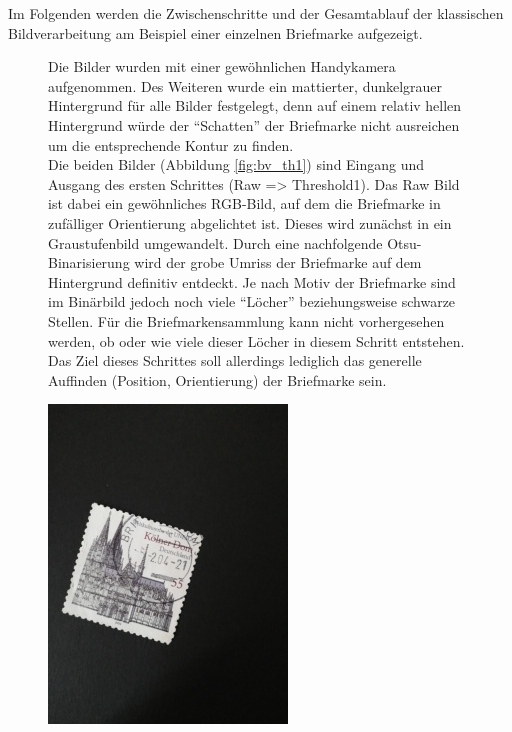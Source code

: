 \documentclass[12pt,toc=bib,toc=listof]{scrreprt}
\begin{document}
Im Folgenden werden die Zwischenschritte und der Gesamtablauf der klassischen Bildverarbeitung am Beispiel einer einzelnen Briefmarke aufgezeigt.
\begin{figure}

\begin{minipage}[t]{.75\linewidth}
Die Bilder wurden mit einer gewöhnlichen Handykamera aufgenommen. Des Weiteren wurde ein mattierter, dunkelgrauer Hintergrund für alle Bilder festgelegt, denn auf einem relativ hellen Hintergrund würde der ``Schatten'' der Briefmarke nicht ausreichen um die entsprechende Kontur zu finden. \\Die beiden Bilder (Abbildung \ref{fig:bv_th1}) sind Eingang und Ausgang des ersten Schrittes (Raw => Threshold1). Das Raw Bild ist dabei ein gewöhnliches RGB-Bild, auf dem die Briefmarke in zufälliger Orientierung abgelichtet ist. Dieses wird zunächst in ein Graustufenbild umgewandelt. Durch eine nachfolgende Otsu-Binarisierung wird der grobe Umriss der Briefmarke auf dem Hintergrund definitiv entdeckt. Je nach Motiv der Briefmarke sind im Binärbild jedoch noch viele ``Löcher'' beziehungsweise schwarze Stellen. Für die Briefmarkensammlung kann nicht vorhergesehen werden, ob oder wie viele dieser Löcher in diesem Schritt entstehen. Das Ziel dieses Schrittes soll allerdings lediglich das generelle Auffinden (Position, Orientierung) der Briefmarke sein.
\end{minipage}
\hfill
\begin{minipage}[t]{.2\linewidth}
  \strut\vspace*{-\baselineskip}\newline\includegraphics[width=\linewidth]{./../bilder/start_dom}

\end{minipage}
\end{figure}
\end{document}
